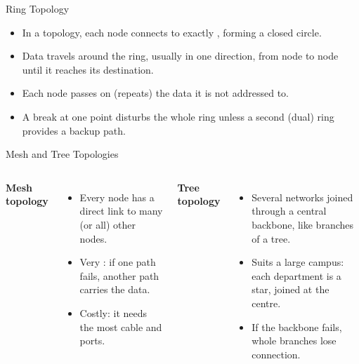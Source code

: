 \documentclass[aspectratio=169]{beamer}
\begin{document}
\begin{frame}{Ring Topology}
  \begin{itemize}
    \item In a  topology, each node connects to exactly
      , forming a closed circle.
    \item Data travels around the ring, usually in one direction, from node
      to node until it reaches its destination.
    \item Each node passes on (repeats) the data it is not addressed to.
    \item A break at one point disturbs the whole ring unless a second
      (dual) ring provides a backup path.
  \end{itemize}
\end{frame}

\begin{frame}{Mesh and Tree Topologies}
  \begin{columns}[T]
      \textbf{Mesh topology}
      \begin{itemize}
        \item Every node has a direct link to many (or all) other nodes.
        \item Very : if one path fails, another path carries
          the data.
        \item Costly: it needs the most cable and ports.
      \end{itemize}
      \textbf{Tree topology}
      \begin{itemize}
        \item Several  networks joined through a central backbone,
          like branches of a tree.
        \item Suits a large campus: each department is a star, joined at
          the centre.
        \item If the backbone fails, whole branches lose connection.
      \end{itemize}
  \end{columns}
  \vspace{0.3cm}
\end{frame}
\end{document}
